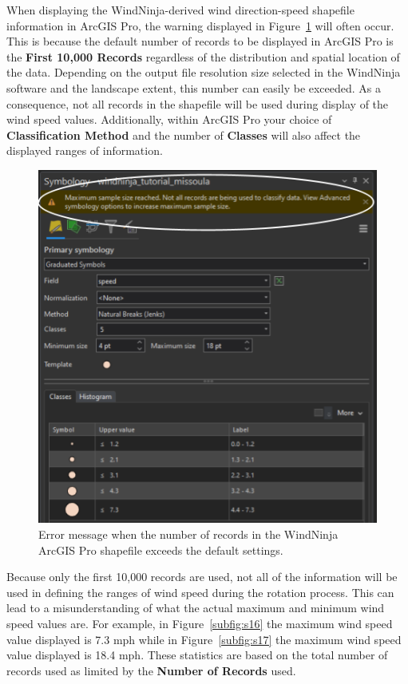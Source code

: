 \documentclass[12pt]{article}
\begin{document}
When displaying the WindNinja-derived wind direction-speed shapefile information in ArcGIS Pro, the warning displayed in Figure~\ref{fig:Figure16} will often occur. This is because the default number of records to be displayed in ArcGIS Pro is the \textbf{First 10,000 Records} regardless of the distribution and spatial location of the data. Depending on the output file resolution size selected in the WindNinja software and the landscape extent, this number can easily be exceeded. As a consequence, not all records in the shapefile will be used during display of the wind speed values. Additionally, within ArcGIS Pro your choice of \textbf{Classification Method} and the number of \textbf{Classes} will also affect the displayed ranges of information.

\begin{figure}[H]
	\centering
	\includegraphics[scale=0.55]{arc_7.png}
	\caption{Error message when the number of records in the WindNinja ArcGIS Pro shapefile exceeds the default settings.}
\label{fig:Figure16}
\end{figure}

Because only the first 10,000 records are used, not all of the information will be used in defining the ranges of wind speed during the rotation process. This can lead to a misunderstanding of what the actual maximum and minimum wind speed values are. For example, in Figure~\ref{subfig:s16} the maximum wind speed value displayed is 7.3 mph while in Figure~\ref{subfig:s17} the maximum wind speed value displayed is 18.4 mph. These statistics are based on the total number of records used as limited by the \textbf{Number of Records} used.
\end{document}
